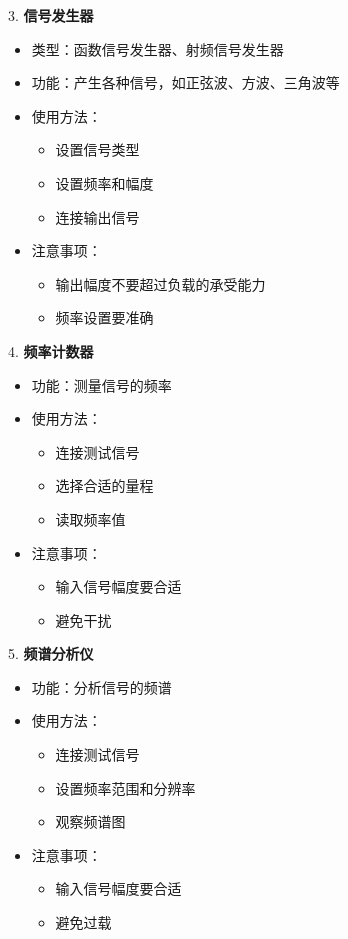 \documentclass[12pt,UTF8]{ctexbook}
\begin{document}
3. \textbf{信号发生器}
   \begin{itemize}[leftmargin=3.5em]
   \item 类型：函数信号发生器、射频信号发生器
   \item 功能：产生各种信号，如正弦波、方波、三角波等
   \item 使用方法：
     \begin{itemize}
       \item 设置信号类型
       \item 设置频率和幅度
       \item 连接输出信号
     \end{itemize}
   \item 注意事项：
     \begin{itemize}
       \item 输出幅度不要超过负载的承受能力
       \item 频率设置要准确
     \end{itemize}
   \end{itemize}

4. \textbf{频率计数器}
   \begin{itemize}[leftmargin=3.5em]
   \item 功能：测量信号的频率
   \item 使用方法：
     \begin{itemize}
       \item 连接测试信号
       \item 选择合适的量程
       \item 读取频率值
     \end{itemize}
   \item 注意事项：
     \begin{itemize}
       \item 输入信号幅度要合适
       \item 避免干扰
     \end{itemize}
   \end{itemize}

5. \textbf{频谱分析仪}
   \begin{itemize}[leftmargin=3.5em]
   \item 功能：分析信号的频谱
   \item 使用方法：
     \begin{itemize}
       \item 连接测试信号
       \item 设置频率范围和分辨率
       \item 观察频谱图
     \end{itemize}
   \item 注意事项：
     \begin{itemize}
       \item 输入信号幅度要合适
       \item 避免过载
     \end{itemize}
   \end{itemize}
\end{document}
